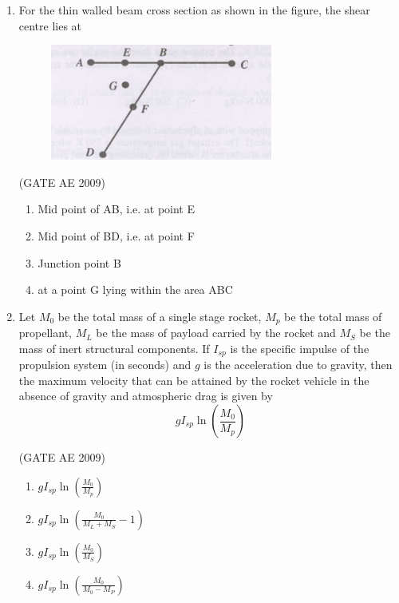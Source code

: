 \documentclass[journal,12pt,onecolumn]{IEEEtran}
\theoremstyle{remark}
\begin{document}
\begin{flushleft}
\begin{enumerate}
\item 
For the thin walled beam cross section as shown in the figure, the shear centre lies at  
\begin{figure}[H]
    \centering
    \includegraphics[width=0.5\columnwidth]{figs/20.png}
    \caption{}
    \label{fig:placeholder}
\end{figure}
\hfill(GATE AE 2009)
\begin{multicols}{2}
\begin{enumerate}
\item Mid point of AB, i.e. at point E
\item Mid point of BD, i.e. at point F
\item Junction point B
\item at a point G lying within the area ABC
\end{enumerate}
\end{multicols}

\item 
Let \( M_0 \) be the total mass of a single stage rocket, \( M_p \) be the total mass of propellant, \( M_L \) be the mass of payload carried by the rocket and \( M_S \) be the mass of inert structural components. If \( I_{sp} \) is the specific impulse of the propulsion system (in seconds) and \( g \) is the acceleration due to gravity, then the maximum velocity that can be attained by the rocket vehicle in the absence of gravity and atmospheric drag is given by
\[
g I_{sp} \ln \left( \frac{M_0}{M_p} \right)
\]

\hfill(GATE AE 2009)
\begin{multicols}{2}
\begin{enumerate}
\item \( g I_{sp} \ln \left( \frac{M_0}{M_p} \right) \)
\item \( g I_{sp} \ln \left( \frac{M_0}{M_L + M_S} - 1 \right) \)
\item \( g I_{sp} \ln \left( \frac{M_0}{M_S} \right) \)
\item \( g I_{sp} \ln \left( \frac{M_0}{M_0 - M_P} \right) \)
\end{enumerate}
\end{multicols}


\end{enumerate}
\end{flushleft}
\end{document}
